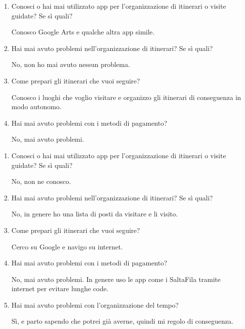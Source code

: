 \clearpage
{}

\begin{enumerate}

\item Conosci o hai mai utilizzato app per l'organizzazione di itinerari o visite guidate? Se sì quali?

Conosco Google Arts e qualche altra app simile.

\item Hai mai avuto problemi nell'organizzazione di itinerari? Se sì quali?

No, non ho mai avuto nessun problema.

\item Come prepari gli itinerari che vuoi seguire?

Conosco i luoghi che voglio visitare e organizzo gli itinerari di conseguenza in modo autonomo.

\item Hai mai avuto problemi con i metodi di pagamento?

No, mai avuto problemi.

\end{enumerate}

\clearpage
{}

\begin{enumerate}

\item Conosci o hai mai utilizzato app per l'organizzazione di itinerari o visite guidate? Se sì quali?

No, non ne conosco.

\item Hai mai avuto problemi nell'organizzazione di itinerari? Se sì quali?

No, in genere ho una lista di posti da visitare e li visito.

\item Come prepari gli itinerari che vuoi seguire?

Cerco su Google e navigo su internet.

\item Hai mai avuto problemi con i metodi di pagamento?

No, mai avuto problemi. In genere uso le app come i SaltaFila tramite internet per evitare lunghe code.

\item Hai mai avuto problemi con l'organizzazione del tempo?

Sì, e parto sapendo che potrei già averne, quindi mi regolo di conseguenza.

\end{enumerate}

